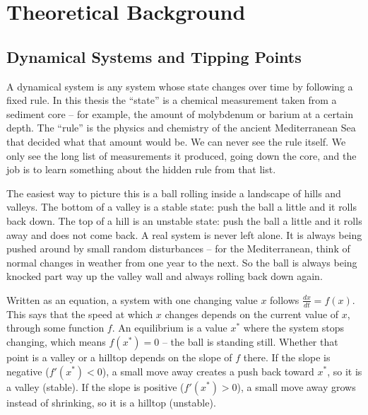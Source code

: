 \chapter{Theoretical Background}
\label{ch:theoretical_background}

\section{Dynamical Systems and Tipping Points}
A dynamical system is any system whose state changes over time by following a fixed rule. In this thesis the ``state'' is a chemical measurement taken from a sediment core -- for example, the amount of molybdenum or barium at a certain depth. The ``rule'' is the physics and chemistry of the ancient Mediterranean Sea that decided what that amount would be. We can never see the rule itself. We only see the long list of measurements it produced, going down the core, and the job is to learn something about the hidden rule from that list.

The easiest way to picture this is a ball rolling inside a landscape of hills and valleys. The bottom of a valley is a stable state: push the ball a little and it rolls back down. The top of a hill is an unstable state: push the ball a little and it rolls away and does not come back. A real system is never left alone. It is always being pushed around by small random disturbances -- for the Mediterranean, think of normal changes in weather from one year to the next. So the ball is always being knocked part way up the valley wall and always rolling back down again.

Written as an equation, a system with one changing value $x$ follows $\frac{dx}{dt} = f(x)$. This says that the speed at which $x$ changes depends on the current value of $x$, through some function $f$. An equilibrium is a value $x^*$ where the system stops changing, which means $f(x^*) = 0$ -- the ball is standing still. Whether that point is a valley or a hilltop depends on the slope of $f$ there. If the slope is negative ($f'(x^*) < 0$), a small move away creates a push back toward $x^*$, so it is a valley (stable). If the slope is positive ($f'(x^*) > 0$), a small move away grows instead of shrinking, so it is a hilltop (unstable).

